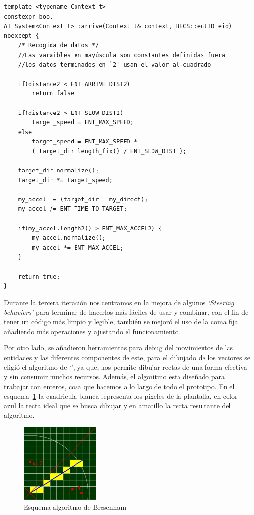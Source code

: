 \begin{lstlisting}[style=CodigoC++, caption={Arrive behavior}, label=ia_arrive] 
template <typename Context_t>
constexpr bool
AI_System<Context_t>::arrive(Context_t& context, BECS::entID eid) noexcept {
	/* Recogida de datos */
	//Las varaibles en mayúscula son constantes definidas fuera
	//los datos terminados en `2' usan el valor al cuadrado

	if(distance2 < ENT_ARRIVE_DIST2)
		return false;

	if(distance2 > ENT_SLOW_DIST2)
		target_speed = ENT_MAX_SPEED;
	else
		target_speed = ENT_MAX_SPEED * 
		( target_dir.length_fix() / ENT_SLOW_DIST );
	
	target_dir.normalize();
	target_dir *= target_speed;

	my_accel  = (target_dir - my_direct);
	my_accel /= ENT_TIME_TO_TARGET;

	if(my_accel.length2() > ENT_MAX_ACCEL2) {
		my_accel.normalize();
		my_accel *= ENT_MAX_ACCEL;
	}

	return true;
}
\end{lstlisting}

Durante la tercera iteración nos centramos en la mejora de algunos \textit{`Steering behaviors'}
para terminar de hacerlos más fáciles de usar y combinar, con el fin de tener un código más 
limpio y legible, también se mejoró el uso de la coma fija añadiendo más operaciones y ajustando
el funcionamiento.

Por otro lado, se añadieron herramientas para debug del movimientos de las entidades y las
diferentes componentes de este, para el dibujado de los vectores se eligió el algoritmo de
`\citeauthor*{Bresenham1962}', ya que, nos permite dibujar rectas de una forma efectiva
y sin consumir muchos recursos. Además, el algoritmo esta diseñado para trabajar con enteros,
cosa que hacemos a lo largo de todo el prototipo. En el esquema~\ref{fig:bresenham} la 
cuadricula blanca representa los pixeles de la plantalla, en color azul la recta ideal que
se busca dibujar y en amarillo la recta resultante del algoritmo.

\begin{figure}[ht]
\centering
\includegraphics[width=0.35\textwidth]{imagenes/diario_desarrollo/linea_ideal.png}
\caption{Esquema algoritmo de Bresenham.}
\label{fig:bresenham}
\end{figure} 

